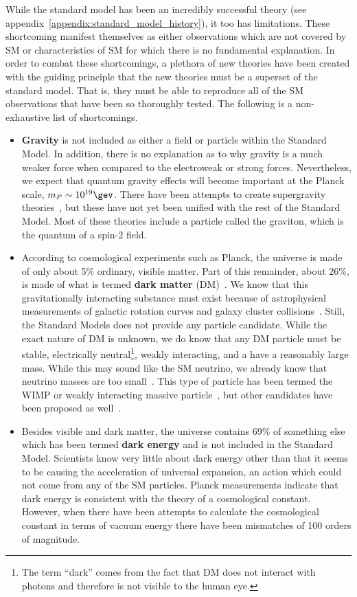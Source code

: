 While the standard model has been an incredibly successful theory (see appendix~\ref{appendix:standard_model_history}), it too has limitations.
These shortcoming manifest themselves as either observations which are not covered by SM or characteristics of SM for which there is no fundamental explanation.
In order to combat these shortcomings, a plethora of new theories have been created with the guiding principle that the new theories must be a superset of the standard model.
That is, they must be able to reproduce all of the SM observations that have been so thoroughly tested.
The following is a non-exhaustive list of shortcomings.
\begin{itemize}
	\item \textbf{Gravity} is not included as either a field or particle within the Standard Model. In addition, there is no explanation as to why gravity is a much weaker force when compared to the electroweak or strong forces. Nevertheless, we expect that quantum gravity effects will become important at the Planck scale, $m_{P}\sim10^{19}\gev$. There have been attempts to create supergravity theories~\cite{VANNIEUWENHUIZEN1981189,Freedman2012,Nastase:2011aa}, but these have not yet been unified with the rest of the Standard Model. Most of these theories include a particle called the graviton, which is the quantum of a spin-2 field.
	\item According to cosmological experiments such as Planck, the universe is made of only about 5\% ordinary, visible matter. Part of this remainder, about 26\%, is made of what is termed \textbf{dark matter} (DM)~\cite{Ade:2015xua,Clowe:2006eq}. We know that this gravitationally interacting substance must exist because of astrophysical measurements of galactic rotation curves and galaxy cluster collisions~\cite{Morrissey20121,Garrett:2010hd}. Still, the Standard Models does not provide any particle candidate.
	While the exact nature of DM is unknown, we do know that any DM particle must be stable, electrically neutral\footnote{The term ``dark'' comes from the fact that DM does not interact with photons and therefore is not visible to the human eye.}, weakly interacting, and a have a reasonably large mass. While this may sound like the SM neutrino, we already know that neutrino masses are too small~\cite{Bertone:2004pz}. This type of particle has been termed the WIMP or weakly interacting massive particle~\cite{Morrissey20121}, but other candidates have been proposed as well~\cite{PDG}.
	\item Besides visible and dark matter, the universe contains 69\% of something else which has been termed \textbf{dark energy} and is not included in the Standard Model. Scientists know very little about dark energy other than that it seems to be causing the acceleration of universal expansion, an action which could not come from any of the SM particles. Planck measurements indicate that dark energy is consistent with the theory of a cosmological constant. However, when there have been attempts to calculate the cosmological constant in terms of vacuum energy there have been mismatches of 100 orders of magnitude. 

\end{itemize}

